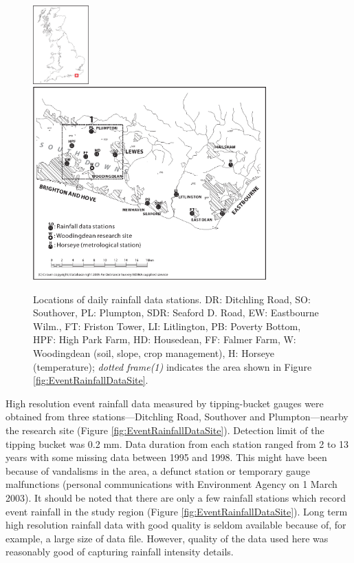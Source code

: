 \begin{figure}[phtb]
  \includegraphics[width=0.19\textwidth]{./img/ukoutline}
  \includegraphics[width=0.8\textwidth]{./img/dailydatasite}
  \caption[Locations of daily rainfall data stations]{Locations of daily
rainfall data stations. DR: Ditchling Road, SO: Southover, PL: Plumpton, SDR:
Seaford D. Road, EW: Eastbourne Wilm., FT: Friston Tower, LI: Litlington, PB:
Poverty Bottom, HPF: High Park Farm, HD: Housedean, FF: Falmer Farm, W:
Woodingdean (soil, slope, crop management), H: Horseye (temperature);
\emph{dotted frame(1)} indicates the area shown in Figure
\ref{fig:EventRainfallDataSite}.}
  \label{fig:DailyRainfallDataSite}
\end{figure}

High resolution event rainfall data measured by tipping-bucket gauges were
obtained from three stations---Ditchling Road, Southover and Plumpton---nearby
the research site (Figure \ref{fig:EventRainfallDataSite}). Detection limit of
the tipping bucket was 0.2 mm. Data duration from each station ranged from 2 to
13 years with some missing data between 1995 and 1998. This might have been
because of vandalisms in the area, a defunct station or temporary gauge
malfunctions (personal communications with Environment Agency on 1 March 2003).
It should be noted that there are only a few rainfall stations which record
event rainfall in the study region (Figure \ref{fig:EventRainfallDataSite}).
Long term high resolution rainfall data with good quality is seldom available
because of, for example, a large size of data file. However, quality of the data
used here was reasonably good of capturing rainfall intensity details.

